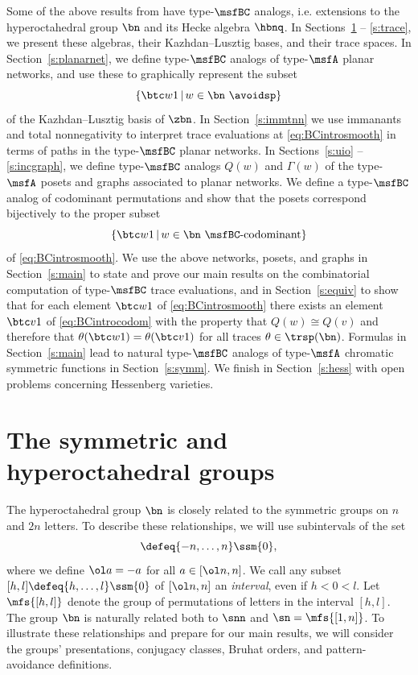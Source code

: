 Some of the above results
from \cite{CHSSkanEKL, SkanNNDCB, SkanCCS}
have type-$\msfBC$ analogs,
i.e. extensions to the hyperoctahedral group $\bn$
and its Hecke algebra $\hbnq$.
In Sections~\ref{s:s2nbn} -- \ref{s:trace},
we present these algebras, their Kazhdan--Lusztig bases,
and their trace spaces.
In Section~\ref{s:planarnet}, we define type-$\msfBC$ analogs
of type-$\msfA$ planar networks, and use these to
graphically represent the subset
\begin{equation}\label{eq:BCintrosmooth}
  \{ \btc w1 \,|\, w \in \bn \text{ \avoidsp} \}
\end{equation}
of the Kazhdan--Lusztig basis of $\zbn$.
In Section~\ref{s:immtnn} we use immanants and total nonnegativity
to interpret trace evaluations at \eqref{eq:BCintrosmooth}
in terms of paths in the type-$\msfBC$ planar networks. 
In Sections~\ref{s:uio} -- \ref{s:incgraph}, we define type-$\msfBC$ analogs
$Q(w)$ and $\Gamma(w)$ of the type-$\msfA$ posets and graphs
associated to planar networks.
We define a type-$\msfBC$ analog of codominant permutations and
show that the posets correspond bijectively to the proper subset
\begin{equation}\label{eq:BCintrocodom}
  \{ \btc w1 \,|\, w \in \bn \text{ $\msfBC$-codominant} \}
\end{equation}
of \eqref{eq:BCintrosmooth}.
We use the above networks, posets, and graphs 
in Section~\ref{s:main}
to state and prove our main results on
the combinatorial computation of type-$\msfBC$ trace evaluations,
and in Section~\ref{s:equiv} to show that
for each element $\btc w1$ of \eqref{eq:BCintrosmooth}
there exists an element $\btc v1$ of \eqref{eq:BCintrocodom}
with the property that $Q(w) \cong Q(v)$
and therefore that $\theta(\btc w1) = \theta(\btc v1)$ for all traces
$\theta \in \trsp(\bn)$.
Formulas in Section~\ref{s:main} lead to natural 
type-$\msfBC$ analogs of
type-$\msfA$ chromatic symmetric functions 
in Section~\ref{s:symm}.
We finish in Section~\ref{s:hess}
with open problems concerning Hessenberg varieties.

\section{The symmetric and hyperoctahedral groups}\label{s:s2nbn}

The hyperoctahedral group $\bn$ is closely related to the symmetric
groups on $n$ and $2n$ letters.  To describe these relationships,
we will use 
subintervals of the set
\begin{equation*}
  [\ol n, n] \defeq \{ -n, \dotsc, n \} \ssm \{ 0 \},
  \end{equation*}
where we define
$\ol a = -a$ for all $a \in [\ol n,n]$.
We call any
subset
$[h,l] \defeq \{ h, \dotsc, l \} \ssm \{0 \}$ of $[\ol n,n]$
an {\em interval}, even if $h < 0 < l$.
Let $\mfs{[h,l]}$ denote
the group of permutations of letters in the interval $[h,l]$.
The group $\bn$ is naturally related both to $\snn$
and $\sn = \mfs{[1,n]}$.
To illustrate these relationships and prepare for our main results,
we will consider the groups' presentations, conjugacy classes, Bruhat
orders, and pattern-avoidance definitions.



